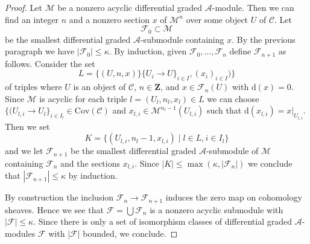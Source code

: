 \documentclass[10pt,a4paper]{amsart}
\theoremstyle{plain}
\theoremstyle{definition}
\theoremstyle{remark}
\numberwithin{equation}{subsection}
\begin{document}
\begin{proof}
\medskip\noindent
Let $\mathcal{M}$ be a nonzero acyclic differential graded
$\mathcal{A}$-module. Then we can find an integer $n$ and a
nonzero section $x$ of $\mathcal{M}^n$ over some object $U$
of $\mathcal{C}$. Let
$$
\mathcal{F}_0 \subset \mathcal{M}
$$
be the smallest differential graded $\mathcal{A}$-submodule
containing $x$. By the previous paragraph we have
$|\mathcal{F}_0| \leq \kappa$. By induction, given
$\mathcal{F}_0, \ldots, \mathcal{F}_n$ define
$\mathcal{F}_{n + 1}$ as follows. Consider the set
$$
L = \{(U, n, x)\}
\{U_i \to U\}_{i \in I}, (x_i)_{i \in I})\}
$$
of triples where $U$ is an object of $\mathcal{C}$, $n \in \mathbf{Z}$,
and $x \in \mathcal{F}_n(U)$ with $\text{d}(x) = 0$. Since
$\mathcal{M}$ is acyclic for each triple $l = (U_l, n_l, x_l) \in L$
we can choose
$\{(U_{l, i} \to U_l\}_{i \in I_l} \in \text{Cov}(\mathcal{C})$ and
$x_{l, i} \in \mathcal{M}^{n_l - 1}(U_{l, i})$ such that
$\text{d}(x_{l, i}) = x|_{U_{l, i}}$. Then we set
$$
K = \{(U_{l, i}, n_l - 1, x_{l, i}) \mid l \in L, i \in I_l\}
$$
and we let $\mathcal{F}_{n + 1}$ be the smallest differential
graded $\mathcal{A}$-submodule of $\mathcal{M}$ containing
$\mathcal{F}_n$ and the sections $x_{l, i}$.
Since $|K| \leq \max(\kappa, |\mathcal{F}_n|)$
we conclude that $|\mathcal{F}_{n + 1}| \leq \kappa$ by induction.

\medskip\noindent
By construction the inclusion $\mathcal{F}_n \to \mathcal{F}_{n + 1}$
induces the zero map on cohomology sheaves. Hence we see that
$\mathcal{F} = \bigcup \mathcal{F}_n$ is a nonzero acyclic submodule
with $|\mathcal{F}| \leq \kappa$. Since there is only a set
of isomorphism classes of differential graded $\mathcal{A}$-modules
$\mathcal{F}$ with $|\mathcal{F}|$ bounded, we conclude.
\end{proof}
\end{document}
